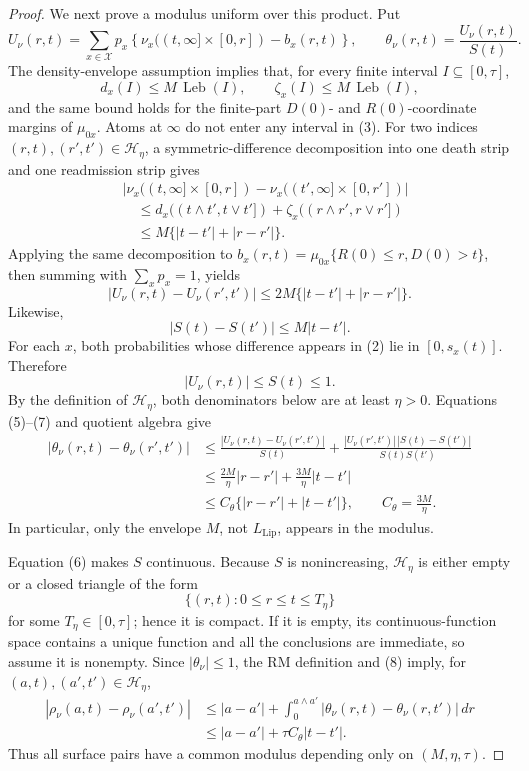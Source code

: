 \documentclass{article}
\begin{document}
\begin{proof}
We next prove a modulus uniform over this product.  Put
\[
 U_\nu(r,t)=\sum_{x\in\mathcal X}p_x
 \left\{\nu_x((t,\infty]\times[0,r])-b_x(r,t)\right\},
 \qquad
 \theta_\nu(r,t)=\frac{U_\nu(r,t)}{S(t)}. \tag{2}
\]
The density-envelope assumption implies that, for every finite interval \(I\subseteq[0,\tau]\),
\[
 d_x(I)\leq M\,\operatorname{Leb}(I),
 \qquad
 \zeta_x(I)\leq M\,\operatorname{Leb}(I), \tag{3}
\]
and the same bound holds for the finite-part \(D(0)\)- and \(R(0)\)-coordinate margins of \(\mu_{0x}\).  Atoms at \(\infty\) do not enter any interval in (3).  For two indices \((r,t),(r',t')\in\mathcal H_\eta\), a symmetric-difference decomposition into one death strip and one readmission strip gives
\[
\begin{aligned}
 &\left|\nu_x((t,\infty]\times[0,r])
 -\nu_x((t',\infty]\times[0,r'])\right|\\
 &\quad\leq d_x((t\wedge t',t\vee t'])
       +\zeta_x((r\wedge r',r\vee r'])\\
 &\quad\leq M\{|t-t'|+|r-r'|\}. 
\end{aligned} \tag{4}
\]
Applying the same decomposition to \(b_x(r,t)=\mu_{0x}\{R(0)\leq r,D(0)>t\}\), then summing with \(\sum_xp_x=1\), yields
\[
 |U_\nu(r,t)-U_\nu(r',t')|
 \leq 2M\{|t-t'|+|r-r'|\}. \tag{5}
\]
Likewise,
\[
 |S(t)-S(t')|\leq M|t-t'|. \tag{6}
\]
For each \(x\), both probabilities whose difference appears in (2) lie in \([0,s_x(t)]\).  Therefore
\[
 |U_\nu(r,t)|\leq S(t)\leq1. \tag{7}
\]
By the definition of \(\mathcal H_\eta\), both denominators below are at least \(\eta>0\).  Equations (5)--(7) and quotient algebra give
\[
\begin{aligned}
 |\theta_\nu(r,t)-\theta_\nu(r',t')|
 &\leq \frac{|U_\nu(r,t)-U_\nu(r',t')|}{S(t)}
 +\frac{|U_\nu(r',t')|\,|S(t)-S(t')|}{S(t)S(t')}\\
 &\leq \frac{2M}{\eta}|r-r'|+\frac{3M}{\eta}|t-t'|\\
 &\leq C_\theta\{|r-r'|+|t-t'|\},
 \qquad C_\theta=\frac{3M}{\eta}. 
\end{aligned} \tag{8}
\]
In particular, only the envelope \(M\), not \(L_{\mathrm{Lip}}\), appears in the modulus.

Equation (6) makes \(S\) continuous.  Because \(S\) is nonincreasing, \(\mathcal H_\eta\) is either empty or a closed triangle of the form
\[
 \{(r,t):0\leq r\leq t\leq T_\eta\}
\]
for some \(T_\eta\in[0,\tau]\); hence it is compact.  If it is empty, its continuous-function space contains a unique function and all the conclusions are immediate, so assume it is nonempty.  Since \(|\theta_\nu|\leq1\), the RM definition and (8) imply, for \((a,t),(a',t')\in\mathcal H_\eta\),
\[
\begin{aligned}
 |\rho_\nu(a,t)-\rho_\nu(a',t')|
 &\leq |a-a'|
 +\int_0^{a\wedge a'}|\theta_\nu(r,t)-\theta_\nu(r,t')|\,dr\\
 &\leq |a-a'|+\tau C_\theta|t-t'|. 
\end{aligned} \tag{9}
\]
Thus all surface pairs have a common modulus depending only on \((M,\eta,\tau)\).


\end{proof}
\end{document}
